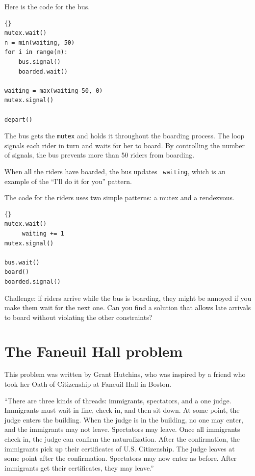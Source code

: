 \documentclass{book}
\newcommand{\clearemptydoublepage}{\newpage\cleardoublepage}
\begin{document}
Here is the code for the bus.

\begin{latin}
\begin{lstlisting}[title={Bus problem solution (bus)}]{}
mutex.wait()
n = min(waiting, 50)
for i in range(n):
    bus.signal()
    boarded.wait()

waiting = max(waiting-50, 0)
mutex.signal()

depart()
\end{lstlisting}
\end{latin}

The bus gets the {\tt mutex} and holds it throughout the boarding
process.  The loop signals each rider in turn and waits for her to
board.  By controlling the number of signals, the bus prevents
more than 50 riders from boarding.

When all the riders have boarded, the bus updates {\tt
waiting}, which is an example of the ``I'll do it for you'' pattern.

The code for the riders uses two
simple patterns: a mutex and a rendezvous.

\begin{latin}
\begin{lstlisting}[title={Bus problem solution (riders)}]{}
mutex.wait()
     waiting += 1
mutex.signal()

bus.wait()
board()
boarded.signal()
\end{lstlisting}
\end{latin}

Challenge: if riders arrive while the bus is boarding, they
might be annoyed if you make them wait for the next one.  Can you
find a solution that allows late arrivals to board without violating
the other constraints?


\clearemptydoublepage
\section{The Faneuil Hall problem}

This problem was written by Grant Hutchins, who was inspired
by a friend who took her
Oath of Citizenship at Faneuil Hall in Boston.

``There are three kinds of threads: immigrants, spectators, and a one
judge.  Immigrants must wait in line, check in, and then sit down.  At
some point, the judge enters the building.  When the judge is in the
building, no one may enter, and the immigrants may not leave.
Spectators may leave.  Once all immigrants check in, the judge can
confirm the naturalization.  After the confirmation, the immigrants
pick up their certificates of U.S. Citizenship.  The judge leaves at
some point after the confirmation.  Spectators may now enter as
before.  After immigrants get their certificates, they may leave.''
\end{document}
